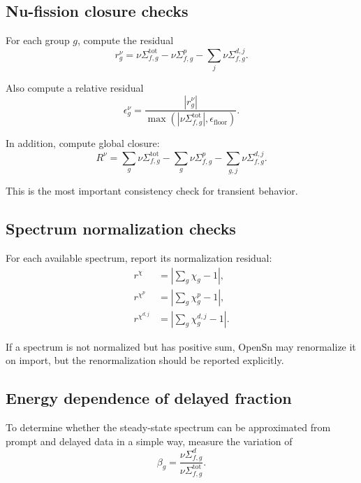 \documentclass[11pt]{article}
\begin{document}
\subsection{Nu-fission closure checks}

For each group \(g\), compute the residual
\begin{equation}
  r^{\nu}_g = \nu \Sigma_{f,g}^{\mathrm{tot}} -
  \nu \Sigma_{f,g}^{p} -
  \sum_j \nu \Sigma_{f,g}^{d,j}.
\end{equation}

Also compute a relative residual
\begin{equation}
  \epsilon^{\nu}_g =
  \frac{\left|r^{\nu}_g\right|}
       {\max\!\left(\left|\nu \Sigma_{f,g}^{\mathrm{tot}}\right|, \epsilon_{\mathrm{floor}}\right)}.
\end{equation}

In addition, compute global closure:
\begin{equation}
  R^{\nu} =
  \sum_g \nu \Sigma_{f,g}^{\mathrm{tot}} -
  \sum_g \nu \Sigma_{f,g}^{p} -
  \sum_{g,j} \nu \Sigma_{f,g}^{d,j}.
\end{equation}

This is the most important consistency check for transient behavior.

\subsection{Spectrum normalization checks}

For each available spectrum, report its normalization residual:
\begin{align}
  r^{\chi} &= \left|\sum_g \chi_g - 1\right|, \\
  r^{\chi^p} &= \left|\sum_g \chi^p_g - 1\right|, \\
  r^{\chi^{d,j}} &= \left|\sum_g \chi^{d,j}_g - 1\right|.
\end{align}

If a spectrum is not normalized but has positive sum, OpenSn may renormalize it on import,
but the renormalization should be reported explicitly.

\subsection{Energy dependence of delayed fraction}

To determine whether the steady-state spectrum can be approximated from prompt and delayed
data in a simple way, measure the variation of
\begin{equation}
  \beta_g = \frac{\nu \Sigma_{f,g}^{d}}{\nu \Sigma_{f,g}^{\mathrm{tot}}}.
\end{equation}
\end{document}
